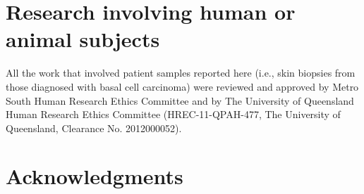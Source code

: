 



\pagebreak





\section*{Research involving human or animal subjects}

\begin{instructional}
	All the work that involved patient samples reported here (i.e., skin biopsies from those diagnosed with basal cell carcinoma) were reviewed and approved by Metro South Human Research Ethics Committee and by The University of Queensland Human Research Ethics Committee (HREC-11-QPAH-477, The University of Queensland, Clearance No. 2012000052).
    
    \noindent
\end{instructional}





\clearpage
\section*{Acknowledgments}

\begin{instructional}
    
    \noindent
    
\end{instructional}



